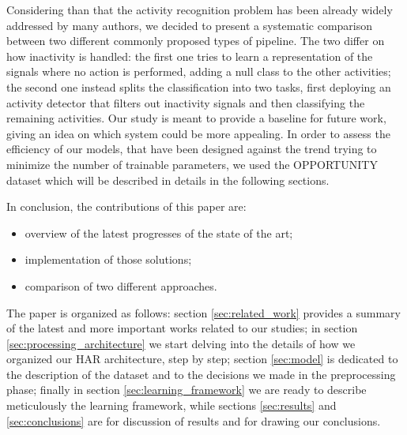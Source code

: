 Considering than that the activity recognition problem has been already widely addressed by many authors, we decided to present a systematic comparison between two different commonly proposed types of pipeline.
The two differ on how inactivity is handled: the first one tries to learn a representation of the signals where no action is performed, adding a null class to the other activities; the second one instead splits the classification into two tasks, first deploying an activity detector that filters out inactivity signals and then classifying the remaining activities.
Our study is meant to provide a baseline for future work, giving an idea on which system could be more appealing.
In order to assess the efficiency of our models, that have been designed against the trend trying to minimize the number of trainable parameters, we used the OPPORTUNITY dataset \cite{Chavarriaga2013, ComplexAct-2010} which will be described in details in the following sections.

In conclusion, the contributions of this paper are:
\begin{itemize}
	\item overview of the latest progresses of the state of the art;
	\item implementation of those solutions;
	\item comparison of two different approaches. 
\end{itemize}
 
The paper is organized as follows: section \ref{sec:related_work} provides a summary of the latest and more important works related to our studies; in section \ref{sec:processing_architecture} we start delving into the details of how we organized our HAR architecture, step by step; section \ref{sec:model} is dedicated to the description of the dataset and to the decisions we made in the preprocessing phase; finally in section \ref{sec:learning_framework} we are ready to describe meticulously the learning framework, while sections \ref{sec:results} and \ref{sec:conclusions} are for discussion of results and for drawing our conclusions. 